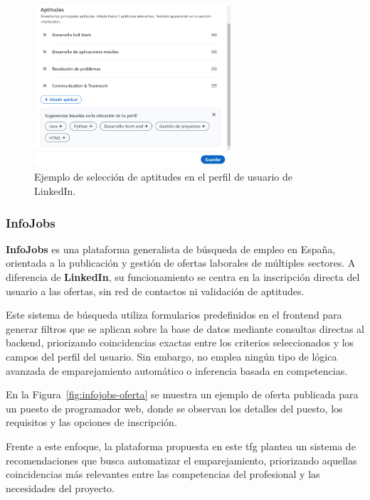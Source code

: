 \begin{figure}[H]
    \centering
    \includegraphics[width=0.65\textwidth]{figs/linkedin-aptitudes.png}
    \caption{Ejemplo de selección de aptitudes en el perfil de usuario de LinkedIn.}
    \label{fig:linkedin-aptitudes}
\end{figure}

\subsubsection{InfoJobs}

\textbf{InfoJobs} \cite{infojobs} es una plataforma generalista de búsqueda de empleo en España, 
orientada a la publicación y gestión de ofertas laborales de múltiples sectores. A diferencia de 
\textbf{LinkedIn}, su funcionamiento se centra en la inscripción directa del usuario a las ofertas, sin 
red de contactos ni validación de aptitudes.

Este sistema de búsqueda utiliza formularios predefinidos en el frontend para generar filtros 
que se aplican sobre la base de datos mediante consultas directas al backend, priorizando 
coincidencias exactas entre los criterios seleccionados y los campos del perfil del usuario. 
Sin embargo, no emplea ningún tipo de lógica avanzada de emparejamiento automático o inferencia 
basada en competencias.

En la Figura~\ref{fig:infojobs-oferta} se muestra un ejemplo de oferta publicada para un puesto de 
programador web, donde se observan los detalles del puesto, los requisitos y las opciones de inscripción.

Frente a este enfoque, la plataforma propuesta en este \gls{tfg} plantea un sistema de recomendaciones 
que busca automatizar el emparejamiento, priorizando aquellas coincidencias más relevantes entre 
las competencias del profesional y las necesidades del proyecto.

